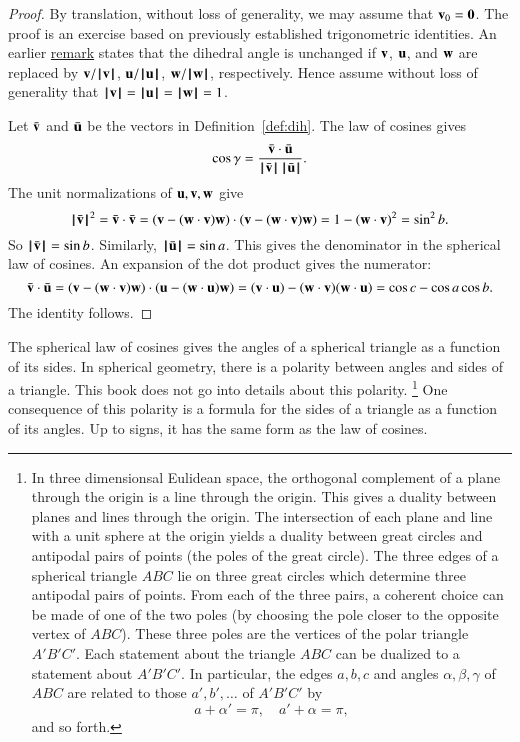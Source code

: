\begin{proof}  By translation, without loss of generality, we may assume that ${\mathbf v}_0={\mathbf 0}$.  
The proof is an exercise based on previously established trigonometric identities.
An earlier \hyperref[rem:dih]{remark} states that the
dihedral angle is unchanged if ${\mathbf v}$, ${\mathbf u}$, and ${\mathbf w}$ are replaced
by ${\mathbf v}/{{\hskip0.1em|\hskip-0.15em|\hskip0.1em}{\mathbf v}{\hskip0.1em|\hskip-0.15em|\hskip0.1em}}$, ${\mathbf u}/{{\hskip0.1em|\hskip-0.15em|\hskip0.1em}{\mathbf u}{\hskip0.1em|\hskip-0.15em|\hskip0.1em}}$, ${\mathbf w}/{{\hskip0.1em|\hskip-0.15em|\hskip0.1em}{\mathbf w}{\hskip0.1em|\hskip-0.15em|\hskip0.1em}}$, respectively.  Hence assume without
loss of generality that ${{\hskip0.1em|\hskip-0.15em|\hskip0.1em}{\mathbf v}{\hskip0.1em|\hskip-0.15em|\hskip0.1em}}={{\hskip0.1em|\hskip-0.15em|\hskip0.1em}{\mathbf u}{\hskip0.1em|\hskip-0.15em|\hskip0.1em}}={{\hskip0.1em|\hskip-0.15em|\hskip0.1em}{\mathbf w}{\hskip0.1em|\hskip-0.15em|\hskip0.1em}}=1$.

Let $\bar {{\mathbf v}}$ and $\bar {{\mathbf u}}$ be the vectors in Definition~\ref{def:dih}.
The law of cosines gives
        \begin{displaymath}\cos\gamma = \frac{\bar {{\mathbf v}}\cdot \bar {{\mathbf u}}}{{{\hskip0.1em|\hskip-0.15em|\hskip0.1em}\bar {{\mathbf v}}{\hskip0.1em|\hskip-0.15em|\hskip0.1em}}\,{{\hskip0.1em|\hskip-0.15em|\hskip0.1em}\bar {{\mathbf u}}{\hskip0.1em|\hskip-0.15em|\hskip0.1em}}}.\end{displaymath}
The unit normalizations of ${\mathbf u},{\mathbf v},{\mathbf w}$ give
        \begin{displaymath}
        {{\hskip0.1em|\hskip-0.15em|\hskip0.1em}\bar {{\mathbf v}}{\hskip0.1em|\hskip-0.15em|\hskip0.1em}}^2 = \bar {{\mathbf v}}\cdot \bar {{\mathbf v}} =
        ({\mathbf v} - ({\mathbf w}\cdot {\mathbf v}){\mathbf w})\cdot ({\mathbf v} - ({\mathbf w}\cdot {\mathbf v}) {\mathbf w}) =
        1 - ({\mathbf w}\cdot {\mathbf v})^2 = \sin^2 b.
        \end{displaymath}
So ${{\hskip0.1em|\hskip-0.15em|\hskip0.1em}\bar {{\mathbf v}}{\hskip0.1em|\hskip-0.15em|\hskip0.1em}} =\sin b$. Similarly, ${{\hskip0.1em|\hskip-0.15em|\hskip0.1em}\bar {{\mathbf u}}{\hskip0.1em|\hskip-0.15em|\hskip0.1em}} = \sin a$.  This gives
the denominator in the spherical law of cosines.  An expansion of the dot product
gives the numerator:
    \begin{displaymath}
    \bar {{\mathbf v}}\cdot \bar {{\mathbf u}} = ({\mathbf v} - ({\mathbf w}\cdot {\mathbf v}) {\mathbf w})\cdot ({\mathbf u} - ({\mathbf w}\cdot {\mathbf u}) {\mathbf w})
    = ({\mathbf v}\cdot {\mathbf u}) - ({\mathbf w}\cdot {\mathbf v}) ({\mathbf w}\cdot {\mathbf u}) = \cos c - \cos
    a \cos b.
    \end{displaymath}
The identity follows.
\end{proof}

The spherical law of cosines gives the angles of a spherical
triangle as a function of its sides.  In spherical geometry,
there is a polarity between angles and sides of a triangle.
This book does not go into details about this polarity.%
\footnote{In three dimensionsal Eulidean space, the orthogonal
complement of a plane through the origin is a line through
the origin.  This gives a duality between planes and lines
through the origin.  The intersection of each plane and line with
a unit sphere at the origin yields a duality between great
circles and antipodal
pairs of points (the poles of the great circle).  The three edges
of a spherical triangle $ABC$ lie on three great circles which
determine three
antipodal pairs of points.  From each of the three  pairs, 
a coherent
choice can be made of one of the two poles (by choosing the pole
closer to the opposite vertex of $ABC$).  
These three poles are the vertices
of the polar triangle $A'B'C'$.  Each statement about the triangle $ABC$
can be dualized to a statement about $A'B'C'$.
In particular, the edges $a,b,c$ and angles $\alpha,\beta,\gamma$ of $ABC$ 
are related to those $a',b',\ldots$ of $A'B'C'$ by
   \begin{displaymath}
   a + \alpha' = \pi,\quad a' + \alpha= \pi,
   \end{displaymath}
and so forth.
}  %
One
consequence of this polarity is a formula for the sides of
a triangle as a function of its angles.  Up to signs,
it has the same form as the law of cosines.
%

